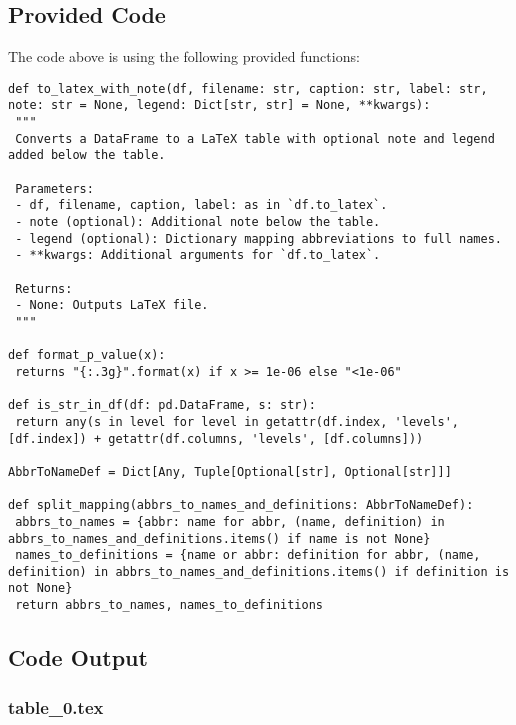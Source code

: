 \documentclass[11pt]{article}
\begin{document}
\subsection{Provided Code}
The code above is using the following provided functions:

\begin{verbatim}
def to_latex_with_note(df, filename: str, caption: str, label: str, note: str = None, legend: Dict[str, str] = None, **kwargs):
 """
 Converts a DataFrame to a LaTeX table with optional note and legend added below the table.

 Parameters:
 - df, filename, caption, label: as in `df.to_latex`.
 - note (optional): Additional note below the table.
 - legend (optional): Dictionary mapping abbreviations to full names.
 - **kwargs: Additional arguments for `df.to_latex`.

 Returns:
 - None: Outputs LaTeX file.
 """

def format_p_value(x):
 returns "{:.3g}".format(x) if x >= 1e-06 else "<1e-06"

def is_str_in_df(df: pd.DataFrame, s: str):
 return any(s in level for level in getattr(df.index, 'levels', [df.index]) + getattr(df.columns, 'levels', [df.columns]))

AbbrToNameDef = Dict[Any, Tuple[Optional[str], Optional[str]]]

def split_mapping(abbrs_to_names_and_definitions: AbbrToNameDef):
 abbrs_to_names = {abbr: name for abbr, (name, definition) in abbrs_to_names_and_definitions.items() if name is not None}
 names_to_definitions = {name or abbr: definition for abbr, (name, definition) in abbrs_to_names_and_definitions.items() if definition is not None}
 return abbrs_to_names, names_to_definitions

\end{verbatim}



\subsection{Code Output}

\subsubsection*{table\_0.tex}
\end{document}
